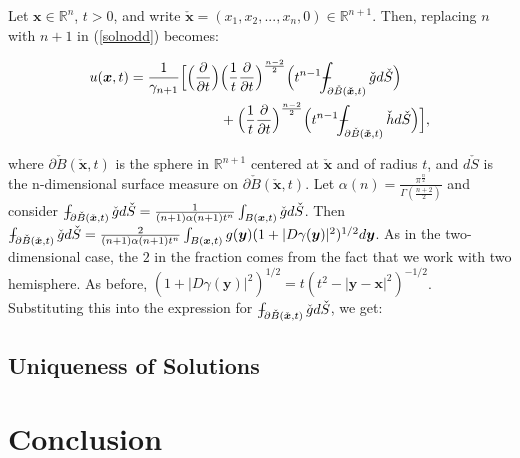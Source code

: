 \documentclass[a4paper, 12pt]{article}
\def\Xint#1{\mathchoice
{\XXint\displaystyle\textstyle{#1}}%
{\XXint\textstyle\scriptstyle{#1}}%
{\XXint\scriptstyle\scriptscriptstyle{#1}}%
{\XXint\scriptscriptstyle\scriptscriptstyle{#1}}%
\!\int}
\def\XXint#1#2#3{{\setbox0=\hbox{$#1{#2#3}{\int}$ }
\vcenter{\hbox{$#2#3$ }}\kern-.6\wd0}}
\def\dashint{\Xint-}
\numberwithin{equation}{section}
\begin{document}
Let $\boldsymbol{x} \in \mathbb{R}^n$, $t>0$, and write $\check{\boldsymbol{x}}=(x_1, x_2, ..., x_n, 0) \in \mathbb{R}^{n+1}$. Then, replacing $n$ with $n+1$ in 
(\ref{solnodd}) becomes:

\begin{equation} \label{solneven}
    \begin{split}
        u(\boldsymbol{x}, t)=\frac{1}{\gamma_{n+1}}\Big[\Big(\diffp[1]{}{t}\Big) & \Big(\frac{1}{t} \diffp[1]{}{t} \Big)^{\frac{n-2}{2}}\Big(t^{n-1} \dashint_{\partial \check{B}(\boldsymbol{\check{x}},t)}\check{g}d\check{S} \Big)\\
        &+ \Big(\frac{1}{t} \diffp[1]{}{t} \Big)^{\frac{n-2}{2}}\Big(t^{n-1} \dashint_{\partial \check{B}(\boldsymbol{\check{x}},t)}\check{h}d\check{S} \Big)\Big],
    \end{split}
\end{equation} 

 where $\partial \check{B}(\boldsymbol{\check{x}},t)$ is the sphere in $\mathbb{R}^{n+1}$ centered at $\boldsymbol{\check{x}}$ and of radius $t$, and 
 $d\check{S}$ is the n-dimensional surface measure on $\partial \check{B}(\boldsymbol{\check{x}},t)$. Let $\alpha(n)=\frac{\pi^{\frac{n}{2}}}{\Gamma(\frac{n+2}{2})}$ and 
 consider $\dashint_{\partial \check{B}(\check{\boldsymbol{x}}, t)} \check{g}d\check{S}=\frac{1}{(n+1)\alpha(n+1)t^n}\int_{B(\boldsymbol{x},t)}\check{g}d\check{S}$. Then
 $\dashint_{\partial \check{B}(\check{\boldsymbol{x}}, t)} \check{g}d\check{S}=\frac{2}{(n+1)\alpha(n+1)t^n}\int_{B(\boldsymbol{x},t)}g(\boldsymbol{y})(1+|D\gamma(\boldsymbol{y})|^2)^{1/2}d\boldsymbol{y}$.
 As in the two-dimensional case, the $2$ in the fraction comes from the fact that we work with two hemisphere. As before, $(1+|D\gamma (\boldsymbol{y})|^2)^{1/2}=t(t^2-|\boldsymbol{y}-\boldsymbol{x}|^2)^{-1/2}$. Substituting this 
 into the expression for $\dashint_{\partial \check{B}(\check{\boldsymbol{x}}, t)} \check{g}d\check{S}$, we get:


\subsection{Uniqueness of Solutions}

\section{Conclusion}

\newpage 



\end{document}
